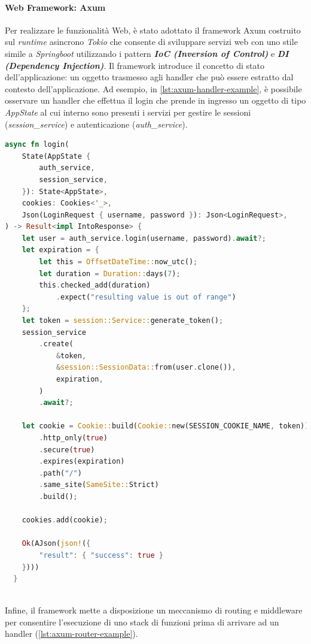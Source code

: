 \documentclass{article}
\begin{document}
\paragraph{Web Framework: Axum} Per realizzare le funzionalità Web, è stato adottato il 
framework Axum costruito sul \textit{runtime} asincrono \textit{Tokio} che consente di 
sviluppare servizi web con uno stile simile a \textit{Springboot} utilizzando i pattern 
\textbf{\textit{IoC (Inversion of Control)}} e \textbf{\textit{DI (Dependency Injection)}}. 
Il framework introduce il concetto di stato dell'applicazione: un oggetto 
trasmesso agli handler che può essere estratto dal contesto dell'applicazione. Ad esempio,
in \cref{lst:axum-handler-example}, è possibile osservare un handler che effettua il login 
che prende  in ingresso un oggetto di tipo \textit{AppState} al cui interno sono presenti i 
servizi  per gestire le sessioni (\textit{session\_service}) e autenticazione 
(\textit{auth\_service}).

\begin{lstlisting}[language=Rust, style=boxed, label={lst:axum-handler-example}, captionpos=b,caption={Esempio di handler in Axum}]
async fn login(
    State(AppState {
        auth_service,
        session_service,
    }): State<AppState>,
    cookies: Cookies<'_>,
    Json(LoginRequest { username, password }): Json<LoginRequest>,
) -> Result<impl IntoResponse> {
    let user = auth_service.login(username, password).await?;
    let expiration = {
        let this = OffsetDateTime::now_utc();
        let duration = Duration::days(7);
        this.checked_add(duration)
            .expect("resulting value is out of range")
    };
    let token = session::Service::generate_token();
    session_service
        .create(
            &token,
            &session::SessionData::from(user.clone()),
            expiration,
        )
        .await?;

    let cookie = Cookie::build(Cookie::new(SESSION_COOKIE_NAME, token))
        .http_only(true)
        .secure(true)
        .expires(expiration)
        .path("/")
        .same_site(SameSite::Strict)
        .build();
    
    cookies.add(cookie);

    Ok(AJson(json!({
        "result": { "success": true }
    })))
  }



\end{lstlisting}

Infine, il framework mette a disposizione un meccanismo di routing e middleware per consentire 
l'esecuzione di uno stack di funzioni prima di arrivare ad un handler (\cref{lst:axum-router-example}). 
\end{document}
